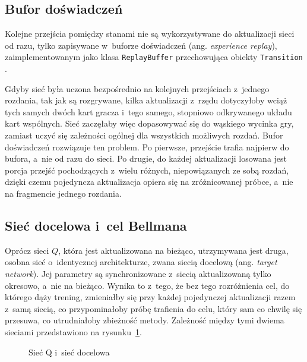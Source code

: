 \subsection{Bufor doświadczeń}

Kolejne przejścia pomiędzy stanami nie są wykorzystywane do aktualizacji
sieci od razu, tylko zapisywane w~buforze doświadczeń (ang. \emph{experience replay}), zaimplementowanym
jako klasa \texttt{ReplayBuffer} przechowująca obiekty \texttt{Transition} \cite{experience_replay,lin_experience_replay_1992}.

Gdyby sieć była uczona bezpośrednio na kolejnych przejściach z~jednego
rozdania, tak jak są rozgrywane, kilka aktualizacji z~rzędu dotyczyłoby
wciąż tych samych dwóch kart gracza i~tego samego, stopniowo
odkrywanego układu kart wspólnych. Sieć zaczęłaby więc dopasowywać się
do wąskiego wycinka gry, zamiast uczyć się
zależności ogólnej dla wszystkich możliwych rozdań. Bufor doświadczeń rozwiązuje ten problem.
Po pierwsze, przejście trafia najpierw do bufora,
a~nie od razu do sieci. Po drugie, do każdej aktualizacji losowana jest
porcja przejść pochodzących z~wielu różnych, niepowiązanych ze sobą
rozdań, dzięki czemu pojedyncza aktualizacja opiera się na
zróżnicowanej próbce, a~nie na fragmencie jednego rozdania.

\subsection{Sieć docelowa i~cel Bellmana}

Oprócz sieci $Q$, która jest aktualizowana na bieżąco, utrzymywana jest druga,
osobna sieć o~identycznej architekturze, zwana siecią docelową (ang. \emph{target network}). Jej parametry
są synchronizowane z~siecią aktualizowaną tylko okresowo, a~nie na bieżąco.
Wynika to z~tego, że bez tego rozróżnienia cel, do którego dąży trening,
zmieniałby się przy każdej pojedynczej aktualizacji razem z~samą siecią,
co przypominałoby próbę trafienia do celu, który sam co chwilę się przesuwa,
co utrudniałoby zbieżność metody. Zależność między tymi dwiema sieciami
przedstawiono na rysunku~\ref{fig:target-network}.

\begin{figure}[htbp]
    \centering
    \caption{Sieć Q i~sieć docelowa}
    \label{fig:target-network}
\end{figure}

